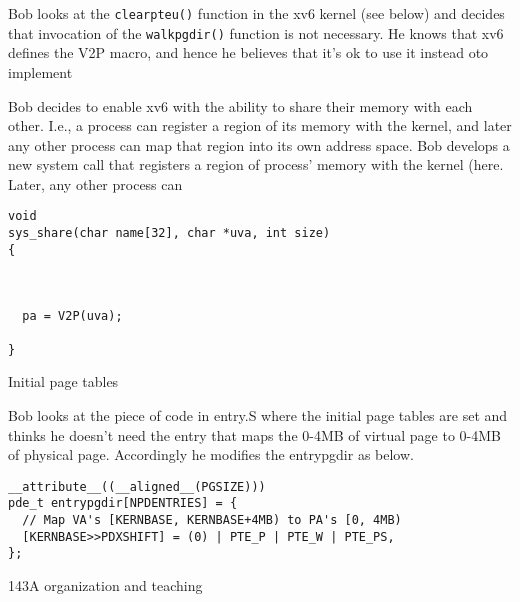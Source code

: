\documentclass[11pt]{exam}
\begin{document}
\begin{questions}
\begin{parts}
Bob looks at the \texttt{clearpteu()} function in the xv6 kernel (see below) and decides that invocation of the \texttt{walkpgdir()} function is not necessary. He knows that xv6 defines the V2P macro, and hence he believes that it's ok to use it instead oto implement 


Bob decides to enable xv6 with the ability to share their memory with each other. I.e., a process can register a region of its memory with the kernel, and later any other process can map that region into its own address space. Bob develops a new system call that registers a region of process' memory with the kernel (here. Later, any other process can 

\begin{verbatim}
void
sys_share(char name[32], char *uva, int size)
{
  
  
  
  pa = V2P(uva);
  
}
\end{verbatim}

\fi

\end{parts} 


\addpoints

\question Initial page tables

Bob looks at the piece of code in entry.S where the initial page tables are
set and thinks he doesn't need the entry that maps the 0-4MB of virtual
page to 0-4MB of physical page. Accordingly he modifies the entrypgdir as
below.

\begin{verbatim}
__attribute__((__aligned__(PGSIZE)))
pde_t entrypgdir[NPDENTRIES] = {
  // Map VA's [KERNBASE, KERNBASE+4MB) to PA's [0, 4MB)
  [KERNBASE>>PDXSHIFT] = (0) | PTE_P | PTE_W | PTE_PS,
};
\end{verbatim}



\newpage

\addpoints
\question 143A organization and teaching



\end{questions}
\afterpage{\null\newpage}
\end{document}
